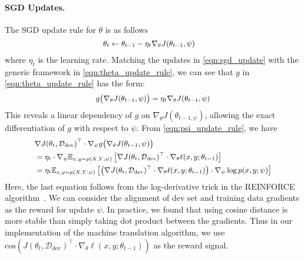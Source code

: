 \paragraph{SGD Updates.} The SGD update rule for $\theta$ is as follows
\begin{equation}
  \label{eqn:sgd_update}
   \small
  \begin{aligned}
    \theta_t &\leftarrow \theta_{t-1} - \eta_t \nabla_\theta J(\theta_{t-1}, \psi)
  \end{aligned}
\end{equation}
where $\eta_t$ is the learning rate. Matching the updates in \autoref{eqn:sgd_update} with the generic framework in \autoref{eqn:theta_update_rule}, we can see that $g$ in \autoref{eqn:theta_update_rule} has the form: %
\begin{equation}
  \label{eqn:momentum_update_g}
   \small
  \begin{aligned}
    g\big(\nabla_\theta J(\theta_{t-1}, \psi)\big) = \eta_t \nabla_\theta J(\theta_{t-1}, \psi)
  \end{aligned}
\end{equation}
This reveals a linear dependency of $g$ on $\nabla_\theta J(\theta_{t-1, \psi})$, allowing the exact differentiation of $g$ with respect to $\psi$. From \autoref{eqn:psi_update_rule}, we have
\begin{equation}
  \label{eqn:momentum_update_for_psi}
   \small
  \begin{aligned}
    &\nabla J(\theta_t, \mathcal{D}_\text{dev})^\top \cdot \nabla_\psi g\big( \nabla_\theta J(\theta_{t-1}, \psi) \big) \\
    &= \eta_t \cdot \nabla_\psi \mathbb{E}_{x, y \sim p(X, Y; \psi)} \left[\nabla J(\theta_t, \mathcal{D}_\text{dev})^\top \cdot \nabla_\theta \ell(x, y; \theta_{t-1} )\right] \\
    &= \eta_t \mathbb{E}_{x, y \sim p(X, Y; \psi)} \left[\left(\nabla J(\theta_t, \mathcal{D}_\text{dev})^\top \cdot \nabla_\theta \ell(x, y; \theta_{t-1} ) \right) \cdot \nabla_\psi \log{p(x, y; \psi)} \right]
  \end{aligned}
\end{equation}
Here, the last equation follows from the log-derivative trick in the REINFORCE algorithm~\citep{reinforce}. We can consider the alignment of dev set and training data gradients as the reward for update $\psi$. In practice, we found that using cosine distance is more stable than simply taking dot product between the gradients. Thus in our implementation of the machine translation algorithm, we use $\text{cos}\left(J(\theta_t, \mathcal{D}_\text{dev})^\top \cdot \nabla_\theta \ell(x, y; \theta_{t-1} ) \right)$ as the reward signal.
